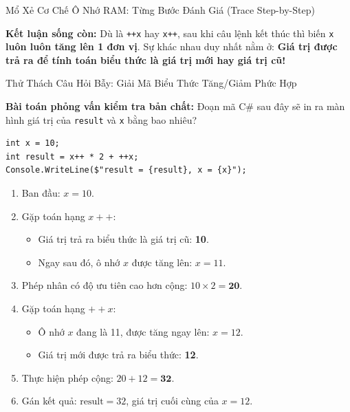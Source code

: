 \documentclass[aspectratio=169, 10pt]{beamer}
\begin{document}
\begin{frame}{Mổ Xẻ Cơ Chế Ô Nhớ RAM: Từng Bước Đánh Giá (Trace Step-by-Step)}
  \begin{alertblock}{\textbf{Kết luận sống còn:}}
    Dù là \texttt{++x} hay \texttt{x++}, sau khi câu lệnh kết thúc thì biến \texttt{x} \textbf{luôn luôn tăng lên 1 đơn vị}. Sự khác nhau duy nhất nằm ở: \textbf{Giá trị được trả ra để tính toán biểu thức là giá trị mới hay giá trị cũ!}
  \end{alertblock}
\end{frame}

\begin{frame}[fragile]{Thử Thách Câu Hỏi Bẫy: Giải Mã Biểu Thức Tăng/Giảm Phức Hợp}
  \begin{exampleblock}{\textbf{Bài toán phỏng vấn kiểm tra bản chất:}}
    Đoạn mã C\# sau đây sẽ in ra màn hình giá trị của \texttt{result} và \texttt{x} bằng bao nhiêu?
\begin{lstlisting}[numbers=none]
int x = 10;
int result = x++ * 2 + ++x;
Console.WriteLine($"result = {result}, x = {x}");
\end{lstlisting}
  \end{exampleblock}

  \begin{tcolorbox}[colback=UniLightBlue!30,colframe=UniNavy,title=\textbf{Phân tích từng bước (Step-by-Step Tracing)},fonttitle=\small\bfseries]
    \begin{enumerate}\small
      \item Ban đầu: $x = 10$.
      \item Gặp toán hạng $x++$:
        \begin{itemize}\footnotesize
          \item Giá trị trả ra biểu thức là giá trị cũ: \textbf{10}.
          \item Ngay sau đó, ô nhớ $x$ được tăng lên: $x = 11$.
        \end{itemize}
      \item Phép nhân có độ ưu tiên cao hơn cộng: $10 \times 2 = \mathbf{20}$.
      \item Gặp toán hạng $++x$:
        \begin{itemize}\footnotesize
          \item Ô nhớ $x$ đang là 11, được tăng ngay lên: $x = 12$.
          \item Giá trị mới được trả ra biểu thức: \textbf{12}.
        \end{itemize}
      \item Thực hiện phép cộng: $20 + 12 = \mathbf{32}$.
      \item Gán kết quả: $\text{result} = 32$, giá trị cuối cùng của $x = 12$.
    \end{enumerate}
  \end{tcolorbox}
\end{frame}
\end{document}

